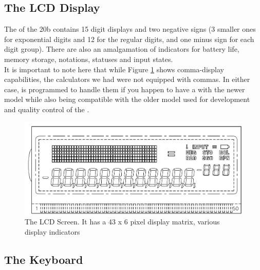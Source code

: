 \documentclass{LibHP20b}
\begin{document}
\pagebreak

\subsection{The LCD Display}

The \LCD{} of the 20b contains 15 \Sev{} digit displays and two negative signs (3 smaller ones for exponential digits and 12 for the regular digits, and one minus sign for each digit group). There are also an amalgamation of indicators for battery life, memory storage, notations, statuses and input states.\\
It is important to note here that while Figure \ref{fig:hp20blcd} shows comma-display capabilities, the calculators we had were not equipped with commas. In either case, \HP{} is programmed to handle them if you happen to have a \HP[] with the newer \LCD{} model while also being compatible with the older model used for development and quality control of the \HP[hp].

\begin{figure}[h]
\centerline{\includegraphics[height=0.4\textwidth]{HP20bLCDLayout.png}}
\caption{The  LCD Screen. It has a 43 x 6 pixel display matrix, various display indicators}
\label{fig:hp20blcd}
\end{figure}

\subsection{The Keyboard}
\end{document}
